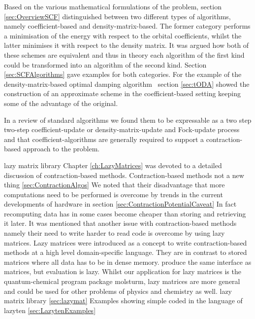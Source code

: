 Based on the various mathematical formulations of the \HF problem,
section \vref{sec:OverviewSCF}
distinguished between two different types of \SCF algorithms,
namely coefficient-based and density-matrix-based.
The former category performs a minimisation of the \HF energy
with respect to the orbital coefficients,
whilst the latter minimises it with respect to the density matrix.
It was argued how both of these schemes are equivalent
and thus in theory each algorithm of the first kind could
be transformed into an algorithm of the second kind.
Section \vref{sec:SCFAlgorithms} gave examples for both categories.
For the example of the density-matrix-based
optimal damping algorithm~\cite{Cances2000a}
section \vref{sec:tODA} showed the construction of
an approximate scheme in the coefficient-based setting
keeping some of the advantage of the original.

In a review of standard \SCF algorithms
we found them to be expressable as a two step
two-step coefficient-update or density-matrix-update and Fock-update
process
and that coefficient-algorithms are generally required
to support a contraction-based approach to the \SCF problem.



\lazyten lazy matrix library
Chapter \ref{ch:LazyMatrices} was devoted to a detailed discussion
of contraction-based methods.
Contraction-based methods not a new thing \vref{sec:ContractionAlgos}
We noted that their disadvantage that more computations
need to be performed is overcome by trends in the current developments
of hardware
in section \vref{sec:ContractionPotentialCaveat}
In fact recomputing data has in some cases become cheaper than storing
and retrieving it later.
It was mentioned that another issue with contraction-based methods
namely their need to write harder to read code
is overcome by using lazy matrices.
Lazy matrices were introduced as a concept to write contraction-based
methods at a high level domain-specific language.
They are in contrast to stored matrices where all data has to be in dense memory.
produce the same interface as matrices,
but evaluation is lazy.
Whilst our application for lazy matrices is the quantum-chemical
program package molsturm,
lazy matrices are more general and could be used for other problems
of physics and chemistry as well.
lazy matrix library \lazyten \vref{sec:lazymat}
Examples showing simple \SCF coded in the language of lazyten \vref{sec:LazytenExamples}

